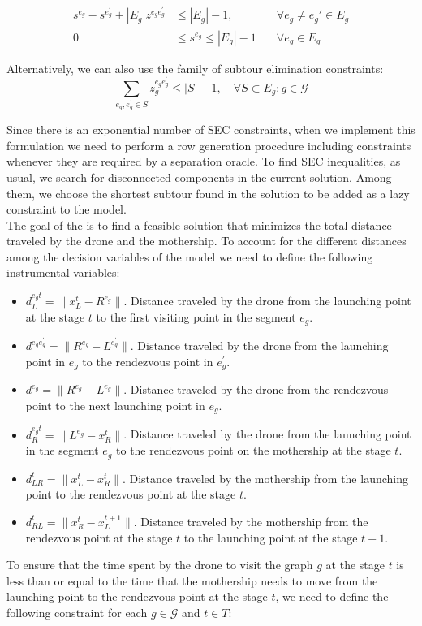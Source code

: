 \begin{align}
    s^{e_g} - s^{e^\prime_g} + |E_g|z^{e_ge^\prime_g} & \leq |E_g| - 1  , &\quad\forall e_g \neq e_g'\in E_g \tag{MTZ$_1$} \label{MTZ1}\\
    0 & \leq s^{e_g} \leq |E_g| - 1 &\quad\forall e_g\in E_g\tag{MTZ$_2$}\label{MTZ2}
\end{align}

\noindent
Alternatively, we can also use the family of subtour elimination constraints:
\begin{equation}\tag{SEC}\label{SEC}
    \sum_{e_g, e^\prime_g \in S} z_g^{e_ge^\prime_g} \leq |S| - 1, \quad \forall S\subset E_g:g\in \mathcal G
\end{equation}

\noindent
Since there is an exponential number of SEC constraints, when we implement this formulation we need to perform a row generation procedure including constraints whenever they are required by a separation oracle. To find SEC inequalities, as usual, we search for disconnected components in the current solution. Among them, we choose the shortest subtour found in the solution to be added as a lazy constraint to the model.\\

\noindent
 The goal of the \AMD\xspace is to find a feasible solution that minimizes the total distance traveled  by the drone and  the mothership. To account for the different distances among the decision variables of the model we need to define the following instrumental variables:
\begin{itemize}
    \item $d_L^{e_gt} = \|x_L^t - R^{e_g}\|$. Distance traveled by the drone from the launching point at the stage $t$ to the first visiting point in the segment $e_g$.
    \item $d^{e_ge^\prime_g} = \|R^{e_g} - L^{e^\prime_g}\|$. Distance traveled by the drone from the launching point in $e_g$ to the rendezvous point in $e^\prime_g$.
    \item $d^{e_g} = \|R^{e_g} - L^{e_g}\|$. Distance traveled by the drone from the rendezvous point  to the next launching point in $e_g$.
    \item $d_R^{e_gt} = \|L^{e_g} - x_R^t\|$. Distance traveled by the drone from the launching point in the segment $e_g$ to the rendezvous point on the mothership at the stage $t$.
    \item $d_{LR}^t = \|x_L^t - x_R^t\|$. Distance traveled by the mothership from the launching point to the rendezvous point at the stage $t$.
    \item $d_{RL}^t = \|x_R^t - x_L^{t+1}\|$. Distance traveled by the mothership from the rendezvous point at the stage $t$ to the launching point at the stage $t+1$.
\end{itemize}
\noindent
To ensure that the time spent by the drone to visit the graph $g$ at the stage $t$ is less than or equal to the time that the mothership needs to move from the launching point to the rendezvous point at the stage $t$, we need to define the following constraint for each $g\in \mathcal G$ and $t\in T$:

